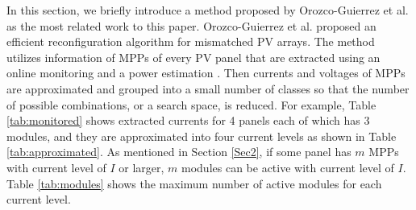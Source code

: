 \documentclass[conference]{IEEEtran}
\begin{document}


In this section, we briefly introduce a method proposed by Orozco-Guierrez et al.\cite{orozco2016optimized} as the most related work to this paper.
Orozco-Guierrez et al. proposed an efficient reconfiguration algorithm
for mismatched PV arrays. 
The method utilizes information of MPPs of every PV panel that are extracted using an online
monitoring \cite{carotenuto2014online} and a power estimation \cite{orozco2015fast}. Then currents and voltages of MPPs are approximated and grouped into a small number of classes so that the number of possible combinations, or a search space, is reduced.
For example, Table \ref{tab:monitored} shows extracted currents for 4 panels each of which has 3 modules, and they are approximated into four current levels as shown in Table \ref{tab:approximated}. As mentioned in Section \ref{Sec2}, if some panel has $m$ MPPs with current level of $I$ or larger, $m$ modules can be active with current level of $I$. 
Table \ref{tab:modules} shows the maximum number of active modules for each current level. 
\end{document}
